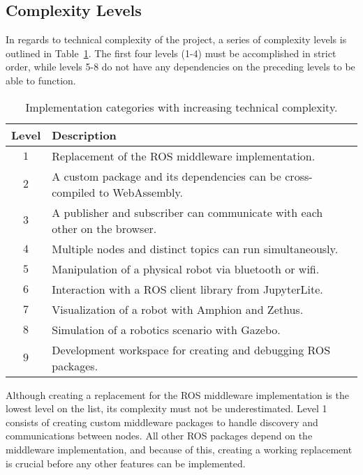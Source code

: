 
    \subsection{Complexity Levels}

        In regards to technical complexity of the project, a series of complexity levels is outlined in Table~\ref{tab:techlevels}. The first four levels (1-4) must be accomplished in strict order, while levels 5-8 do not have any dependencies on the preceding levels to be able to function.        

        \begin{table}[htbp]
            \color{textColor}
            \centering	
            \caption{Implementation categories with increasing technical complexity.}
                \begin{tabular}{cl}
                    \toprule
                    \textbf{Level} & \textbf{Description} \\
                    \midrule
                    $1$ & Replacement of the \ac{ROS} middleware implementation. \\ [0.3em]
                    $2$ & A custom package and its dependencies can be cross-compiled to WebAssembly. \\[0.3em]
                    $3$ & A publisher and subscriber can communicate with each other on the browser.\\[0.3em]
                    $4$ & Multiple nodes and distinct topics can run simultaneously. \\[0.3em]
                    $5$ & Manipulation of a physical robot via bluetooth or wifi. \\[0.3em]
                    $6$ & Interaction with a ROS client library from JupyterLite. \\[0.3em]
                    $7$ & Visualization of a robot with Amphion and Zethus. \\[0.3em]
                    $8$ & Simulation of a robotics scenario with Gazebo. \\[0.3em]
                    $9$ & Development workspace for creating and debugging ROS packages. \\
                \bottomrule
            \end{tabular}\label{tab:techlevels}
        \end{table}

        Although creating a replacement for the \ac{ROS} middleware implementation is the lowest level on the list, its complexity must not be underestimated. Level 1 consists of creating custom middleware packages to handle discovery and communications between nodes. All other \ac{ROS} packages depend on the middleware implementation, and because of this, creating a working replacement is crucial before any other features can be implemented.

